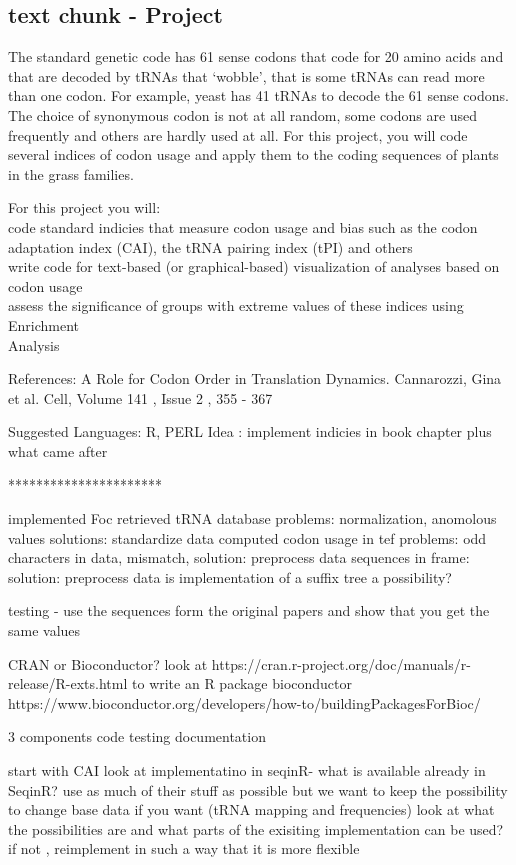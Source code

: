 \subsection{text chunk - Project}
The standard genetic code has 61 sense codons that code for 20 amino acids and that are decoded by 
tRNAs that ‘wobble’, that is some tRNAs can read more than one codon. For example, yeast has 41 
tRNAs to decode the 61 sense codons. The choice of synonymous codon is not at all random, some 
codons are used frequently and others are hardly used at all. For this project, you will code several 
indices of codon usage and apply them to the coding sequences of plants in the grass families. 

For this project you will:\\
code standard indicies that measure codon usage and bias such as the codon adaptation index 
(CAI), the tRNA pairing index (tPI) and others \\
write code for text-based (or graphical-based) visualization of analyses based on codon usage\\
assess the significance of groups with extreme values of these indices using Enrichment\\

Analysis 

References: A Role for Codon Order in Translation Dynamics. Cannarozzi, Gina et al. Cell, 
Volume 141 , Issue 2 , 355 - 367

Suggested Languages: R, PERL
Idea : implement indicies in book chapter plus what came after 

**********************

implemented Foc
retrieved tRNA database problems: normalization, anomolous values solutions: standardize data
computed codon usage in tef problems: odd characters in data, mismatch, solution: preprocess data
sequences in frame: solution: preprocess data
is implementation of a suffix tree a possibility?



testing - use the sequences form the original papers and show that you get the same values

CRAN or Bioconductor?
look at https://cran.r-project.org/doc/manuals/r-release/R-exts.html to write an R package
bioconductor  https://www.bioconductor.org/developers/how-to/buildingPackagesForBioc/

3 components
  code
  testing
  documentation

start with CAI
 look at implementatino in seqinR-  what is available already in SeqinR? use as much of their stuff as possible but we want to keep the possibility to change base data if you want (tRNA mapping and frequencies)
 look at what the possibilities are and what parts of the exisiting implementation can be used?
 if not , reimplement in such a way that it is more flexible 


